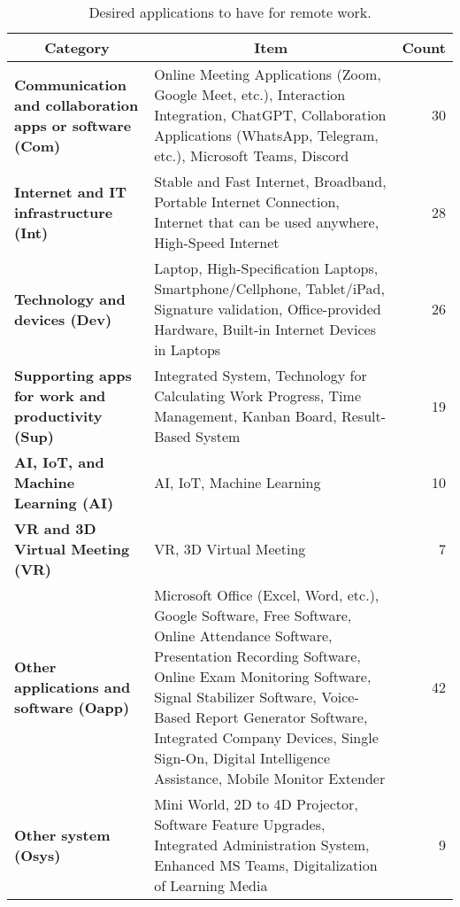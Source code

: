 \documentclass[conference]{IEEEtran}
\begin{document}
\begin{table*}
	\centering
	\caption{Desired applications to have for remote work.}
	\label{tab:required_apps_for_remote_work}
	\begin{tabular}{|p{}|p{}|r|}
		\hline
		\multicolumn{1}{|c|}{\textbf{Category}}                                   & \multicolumn{1}{c|}{\textbf{Item}}                                                                                                                                                                                   & \multicolumn{1}{c|}{\textbf{Count}} \\ \hline
		\textbf{Communication  and  collaboration apps or software (Com)} & Online Meeting Applications (Zoom, Google Meet, etc.), Interaction Integration, ChatGPT, Collaboration Applications (WhatsApp, Telegram, etc.), Microsoft Teams, Discord                                                                                     & 30 %
		\\ \hline
		\textbf{Internet and IT infrastructure (Int)} & Stable and Fast Internet, Broadband, Portable Internet Connection, Internet that can be used anywhere, High-Speed Internet & 28 %
		\\ \hline
		\textbf{Technology and devices (Dev)} & Laptop, High-Specification Laptops, Smartphone/Cellphone, Tablet/iPad, Signature validation, Office-provided Hardware, Built-in Internet Devices in Laptops                                                                                                                          & 26 %
		\\ \hline
		\textbf{Supporting apps for work and productivity (Sup)} & Integrated System, Technology for Calculating Work Progress, Time Management, Kanban Board, Result-Based System & 19 %
		\\ \hline
		\textbf{AI, IoT, and  Machine  Learning (AI)} & AI, IoT, Machine Learning
		& 10 %
		\\ \hline
		\textbf{VR and 3D  Virtual Meeting (VR)} & VR, 3D Virtual Meeting & 7%
		\\ \hline
		\textbf{Other applications and software (Oapp)} & Microsoft Office (Excel, Word, etc.), Google Software, Free Software, Online Attendance Software, Presentation Recording Software, Online Exam Monitoring Software, Signal Stabilizer Software, Voice-Based Report Generator Software, Integrated Company Devices, Single Sign-On, Digital Intelligence Assistance, Mobile Monitor Extender & 42 %
		\\ \hline
		\textbf{Other system (Osys)} & Mini World, 2D to 4D Projector, Software Feature Upgrades, Integrated Administration System, Enhanced MS Teams, Digitalization of Learning Media & 9 %
		\\ \hline
	\end{tabular}
\end{table*}
\end{document}

